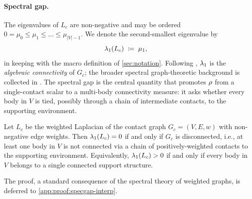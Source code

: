 \paragraph{Spectral gap.}
The eigenvalues of $L_{c}$ are non-negative and may be ordered
$0 = \mu_{0} \le \mu_{1} \le \dots \le \mu_{|V|-1}$. We denote
the second-smallest eigenvalue by
\begin{equation}
\label{eq:specgap-def}
  \lambda_{1}(L_{c}) \;\coloneqq\; \mu_{1},
\end{equation}
in keeping with the macro definition of \cref{sec:notation}.
Following \citet{Fiedler1973}, $\lambda_{1}$ is the
\emph{algebraic connectivity} of $G_{c}$; the broader spectral
graph-theoretic background is collected in \citet{Chung1997}.
The spectral gap is the central quantity that promotes
$\rho$ from a single-contact scalar to a multi-body
connectivity measure: it asks whether every body in $V$ is tied,
possibly through a chain of intermediate contacts, to the
supporting environment.

\begin{lemma}\label{lem:specgap-interp}
Let $L_{c}$ be the weighted Laplacian of the contact graph
$G_{c} = (V, E, w)$ with non-negative edge weights. Then
$\lambda_{1}(L_{c}) = 0$ if and only if $G_{c}$ is disconnected,
i.e., at least one body in $V$ is not connected via a chain of
positively-weighted contacts to the supporting environment.
Equivalently, $\lambda_{1}(L_{c}) > 0$ if and only if every body
in $V$ belongs to a single connected support structure.
\end{lemma}

The proof, a standard consequence of the spectral theory of
weighted graphs, is deferred to
\cref{app:proof:specgap-interp}.

